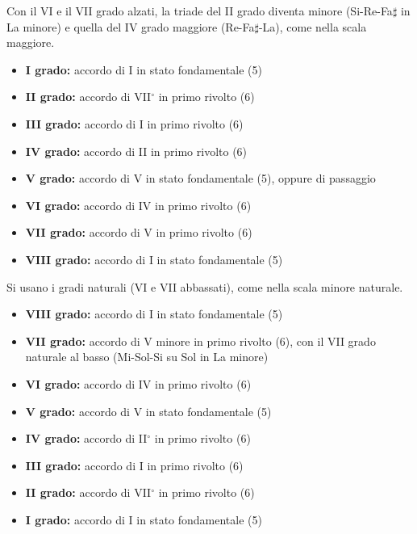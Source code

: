 \begin{regola}
	\label{reg:regola_ottava_melodica_asc}
	Con il VI e il VII grado alzati, la triade del II grado diventa minore (Si-Re-Fa$\sharp$ in La minore) e quella del IV grado maggiore (Re-Fa$\sharp$-La), come nella scala maggiore.
	\begin{itemize}
		\item \textbf{I grado:} accordo di I in stato fondamentale (5)
		\item \textbf{II grado:} accordo di VII$^\circ$ in primo rivolto (6)
		\item \textbf{III grado:} accordo di I in primo rivolto (6)
		\item \textbf{IV grado:} accordo di II in primo rivolto (6)
		\item \textbf{V grado:} accordo di V in stato fondamentale (5), oppure  di passaggio
		\item \textbf{VI grado:} accordo di IV in primo rivolto (6)
		\item \textbf{VII grado:} accordo di V in primo rivolto (6)
		\item \textbf{VIII grado:} accordo di I in stato fondamentale (5)
	\end{itemize}
\end{regola}

\begin{regola}
	\label{reg:regola_ottava_melodica_disc}
	Si usano i gradi naturali (VI e VII abbassati), come nella scala minore naturale.
	\begin{itemize}
		\item \textbf{VIII grado:} accordo di I in stato fondamentale (5)
		\item \textbf{VII grado:} accordo di V minore in primo rivolto (6), con il VII grado naturale al basso (Mi-Sol-Si su Sol in La minore)
		\item \textbf{VI grado:} accordo di IV in primo rivolto (6)
		\item \textbf{V grado:} accordo di V in stato fondamentale (5)
		\item \textbf{IV grado:} accordo di II$^\circ$ in primo rivolto (6)
		\item \textbf{III grado:} accordo di I in primo rivolto (6)
		\item \textbf{II grado:} accordo di VII$^\circ$ in primo rivolto (6)
		\item \textbf{I grado:} accordo di I in stato fondamentale (5)
	\end{itemize}
\end{regola}

